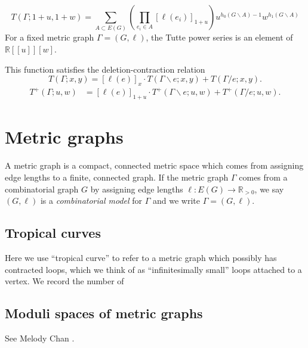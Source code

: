 \documentclass{amsart}
\theoremstyle{definition}
\newcommand{\RR}{\mathbb{R}}
\begin{document}
\begin{equation*}
T(\Gamma; 1+u,1+w) = \sum_{A \subset E(G)} \left( \prod_{e_i \in A} [\ell(e_i)]_{1+u} \right)
u^{h_0(G\backslash A) - 1}w^{h_1(G\backslash A)}
\end{equation*}
For a fixed metric graph $\Gamma = (G,\ell)$, the Tutte power series is an element of 
$\RR[[u]][w]$.

This function satisfies the deletion-contraction relation
\begin{equation*}
T(\Gamma; x,y) = [\ell(e)]_x \cdot T(\Gamma \backslash e; x,y) + T(\Gamma / e; x,y) .
\end{equation*}
\begin{align*}
T^+({\Gamma};u,w) &= 
[\ell(e)]_{1+u} \cdot T^+(\Gamma \backslash e; u,w) 
 + T^+(\Gamma / e; u,w) .
\end{align*}

\section{Metric graphs}
A metric graph is a compact, connected metric space which comes from 
assigning edge lengths to a finite, connected graph.
If the metric graph $\Gamma$
comes from a combinatorial graph $G$ by 
assigning edge lengths $\ell : E(G) \to \RR_{>0}$,
we say $(G,\ell)$ is a {\em combinatorial model} for $\Gamma$
and we write $\Gamma = (G,\ell)$.


\subsection{Tropical curves}

Here we use ``tropical curve'' 
to refer to a metric graph which possibly has contracted loops,
which we think of as ``infinitesimally small'' loops attached to a vertex.
We record the number of 

\subsection{Moduli spaces of metric graphs}
See Melody Chan \cite{Cha}.

\cite{ACP}
\end{document}
